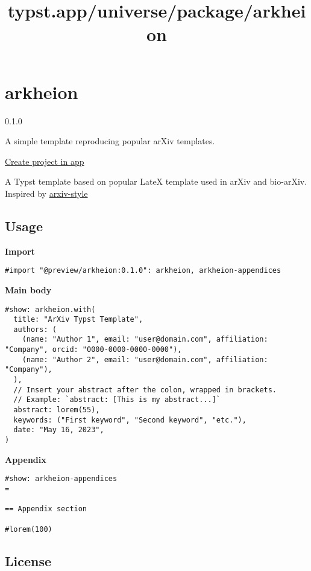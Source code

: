 \title{typst.app/universe/package/arkheion}

\label{banner}
\label{template-thumbnail}

\section{arkheion}\label{arkheion}

{ 0.1.0 }

A simple template reproducing popular arXiv templates.

\href{/app?template=arkheion&version=0.1.0}{Create project in app}

\label{readme}
A Typst template based on popular LateX template used in arXiv and
bio-arXiv. Inspired by
\href{https://github.com/kourgeorge/arxiv-style}{arxiv-style}

\subsection{Usage}\label{usage}

\textbf{Import}

\begin{verbatim}
#import "@preview/arkheion:0.1.0": arkheion, arkheion-appendices
\end{verbatim}

\textbf{Main body}

\begin{verbatim}
#show: arkheion.with(
  title: "ArXiv Typst Template",
  authors: (
    (name: "Author 1", email: "user@domain.com", affiliation: "Company", orcid: "0000-0000-0000-0000"),
    (name: "Author 2", email: "user@domain.com", affiliation: "Company"),
  ),
  // Insert your abstract after the colon, wrapped in brackets.
  // Example: `abstract: [This is my abstract...]`
  abstract: lorem(55),
  keywords: ("First keyword", "Second keyword", "etc."),
  date: "May 16, 2023",
)
\end{verbatim}

\textbf{Appendix}

\begin{verbatim}
#show: arkheion-appendices
=

== Appendix section

#lorem(100)
\end{verbatim}

\subsection{License}\label{license}

